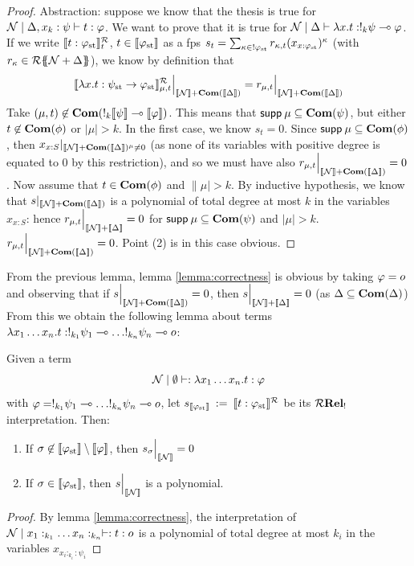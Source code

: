 \begin{proof}
	Abstraction: suppose we know that the thesis is true for $\mathcal{N}\mid\Delta, x_k: \psi \vdash t: \varphi$. We want to prove that it is true for $\mathcal{N}\mid\Delta \vdash \lambda x. t: !_k \psi \multimap \varphi$. If we write $\llbracket t: {\varphi}_{\mathrm{st}}\rrbracket^{\mathcal{R}}_t$, $t \in \llbracket{\varphi}_{\mathrm{st}}\rrbracket$ as a fps $s_t=\sum_{\kappa \in !{{\varphi}_{\mathrm{st}}}} r_{\kappa,t} (x_{{x:{\varphi}_{\mathrm{st}}}})^\kappa$ (with $r_\kappa \in {\mathcal{R}}\{\!\!\{\mathcal{N}+\Delta\}\!\!\} $), we know by definition that 
	$$\llbracket \lambda x. t:  {\psi}_{\mathrm{st}} \to {\varphi}_{\mathrm{st}} \rrbracket^{\mathcal{R}}_{\mu, t} \Big\vert_{\llbracket\mathcal{N}\rrbracket+ \mathbf{Com}(\llbracket\Delta\rrbracket)} = r_{\mu, t} \Big\vert_{\llbracket\mathcal{N}\rrbracket+ \mathbf{Com}(\llbracket\Delta\rrbracket)} $$
	Take $(\mu, t) \not \in \mathbf{Com}(!_k\llbracket\psi\rrbracket \multimap \llbracket\varphi\rrbracket)$. This means that $\mathsf{supp} \: \mu \subseteq \mathbf{Com}(\psi)$, but either $t \not \in \mathbf{Com}(\phi)$ or $|\mu| > k$. In the first case, we know $s_t=0$. Since $\mathsf{supp} \: \mu \subseteq \mathbf{Com}(\phi)$, then $x_{x:S}\vert_{\llbracket\mathcal{N}\rrbracket+ \mathbf{Com}(\llbracket\Delta\rrbracket)^\mu \neq 0}$ (as none of its variables with positive degree is equated to $0$ by this restriction), and so we must have also $r_{\mu, t} \Big\vert_{\llbracket\mathcal{N}\rrbracket+ \mathbf{Com}(\llbracket\Delta\rrbracket)}=0$.  
	Now assume that $t \in \mathbf{Com}(\phi)$ and $\|\mu| > k$. By inductive hypothesis, we know that $s\vert_{\llbracket\mathcal{N}\rrbracket+ \mathbf{Com}(\llbracket\Delta\rrbracket)}$ is a polynomial of total degree at most $k$ in the variables $x_{x:S}$: hence $r_{\mu, t} \Big\vert_{\llbracket\mathcal{N}\rrbracket+ \llbracket\Delta\rrbracket}=0$ for $\mathsf{supp} \: \mu \subseteq \mathbf{Com}(\psi)$ and $|\mu| > k$.
	 $r_{\mu, t} \Big\vert_{\llbracket\mathcal{N}\rrbracket+ \mathbf{Com}(\llbracket\Delta\rrbracket)}=0$. Point (2) is in this case obvious. 
\end{proof} 
From the previous lemma, lemma \ref{lemma:correctness} is obvious by taking $\varphi=o$  and observing that if $s\Big\vert_{\llbracket\mathcal{N}\rrbracket+ \mathbf{Com}(\llbracket\Delta\rrbracket)}=0$, then  $s\Big\vert_{\llbracket\mathcal{N}\rrbracket+ \llbracket\Delta\rrbracket}=0$ (as $\Delta \subseteq \mathbf{Com}(\Delta)$)
From this we obtain the following lemma about terms $\lambda x_1 \dots x_n.t: !_{k_1} \psi_1 \multimap \dots !_{k_n} \psi_n \multimap o $:
\begin{lemma}
	Given a term $$\mathcal{N}\mid\emptyset \vdash : \lambda x_1 \dots x_n.t: \varphi$$ with $\varphi = !_{k_1} \psi_1 \multimap \dots !_{k_n} \psi_n \multimap o$, let $s_{\llbracket{\varphi}_{\mathrm{st}}\rrbracket} \: := \: \llbracket t: {\varphi}_{\mathrm{st}}\rrbracket^{\mathcal{R}} $ be its $\mathcal{R}\mathbf{Rel_!}$interpretation. Then:
	\begin{enumerate}
		\item If $\sigma \not \in \llbracket{\varphi}_{\mathrm{st}}\rrbracket \setminus \llbracket\varphi\rrbracket$, then $s_\sigma\Big\vert_{\llbracket\mathcal{N}\rrbracket}=0$
		\item If  $\sigma \in \llbracket{\varphi}_{\mathrm{st}}\rrbracket$, then $s \Big\vert_{\llbracket\mathcal{N}\rrbracket}$ is a polynomial. 
	\end{enumerate}
\end{lemma}
\begin{proof}
	By lemma \ref{lemma:correctness}, the interpretation of $\mathcal{N}\mid x_1:_{k_1} \dots x_n:_{k_n} \vdash : t: o$ is a polynomial of total degree at most $k_i$ in the variables $x_{x_i:_{k_i}: \psi_i}$
\end{proof}
